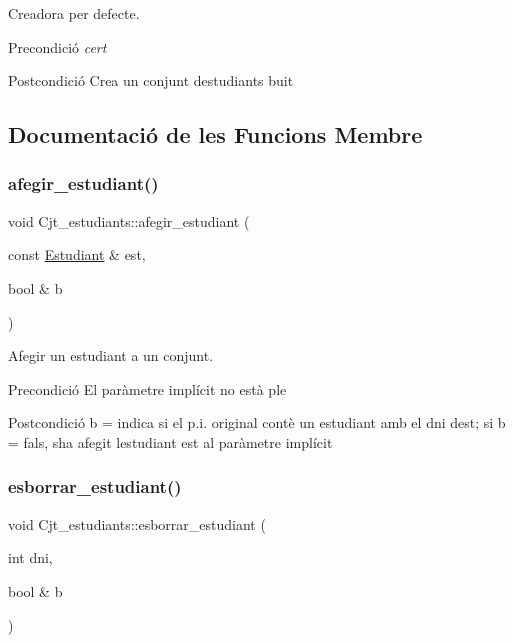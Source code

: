 Creadora per defecte. 

\begin{DoxyPrecond}{Precondició}
{\itshape cert} 
\end{DoxyPrecond}
\begin{DoxyPostcond}{Postcondició}
Crea un conjunt d\textquotesingle{}estudiants buit 
\end{DoxyPostcond}


\subsection{Documentació de les Funcions Membre}
\mbox{\label{class_cjt__estudiants_a4188715904e017fa15b9ad8bc63112b6}} 
\subsubsection{\texorpdfstring{afegir\+\_\+estudiant()}{afegir\_estudiant()}}
{\footnotesize\ttfamily void Cjt\+\_\+estudiants\+::afegir\+\_\+estudiant (\begin{DoxyParamCaption}\item[{const \hyperlink{class_estudiant}{Estudiant} \&}]{est,  }\item[{bool \&}]{b }\end{DoxyParamCaption})}



Afegir un estudiant a un conjunt. 

\begin{DoxyPrecond}{Precondició}
El paràmetre implícit no està ple 
\end{DoxyPrecond}
\begin{DoxyPostcond}{Postcondició}
b = indica si el p.\+i. original contè un estudiant amb el dni d\textquotesingle{}est; si b = fals, s\textquotesingle{}ha afegit l\textquotesingle{}estudiant est al paràmetre implícit 
\end{DoxyPostcond}
\mbox{\label{class_cjt__estudiants_a6632e0cecaa9d698cb51da07c9e58402}} 
\subsubsection{\texorpdfstring{esborrar\+\_\+estudiant()}{esborrar\_estudiant()}}
{\footnotesize\ttfamily void Cjt\+\_\+estudiants\+::esborrar\+\_\+estudiant (\begin{DoxyParamCaption}\item[{int}]{dni,  }\item[{bool \&}]{b }\end{DoxyParamCaption})}



